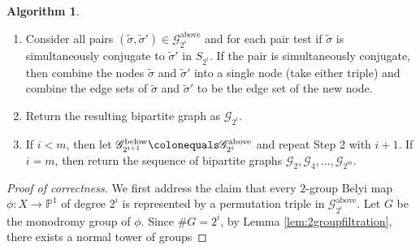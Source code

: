 \documentclass{dcthesis}
\newcommand{\PP}{\mathbb P}
\newcommand{\wt}[1]{\widetilde{#1}}
\DeclareMathOperator{\Lifts}{Lifts}
\theoremstyle{definition}
\newtheorem{alg}[prop]{Algorithm}
\theoremstyle{remark}
\numberwithin{equation}{section}
\numberwithin{figure}{section}
\begin{document}
{{\begin{alg}
\begin{enumerate}
\begin{enumerate}
              As a word of caution,
              the notation $\Lifts(\sigma)$ has
              a different meaning here than in
              Algorithm \ref{alg:triples}.
              Here $\Lifts(\sigma)$ is the set of
              lifts of $\sigma$ up to simultaneous
              conjugation.
              Let
              \[
                \mathscr{G}_{2^i}^\text{above}
                \colonequals
                \bigcup_{\sigma\in\mathscr{G}_{2^i}^\text{below}}
                \Lifts(\sigma)
              \]
              and place an edge 
              of $\mathscr{G}_{2^i}$
              between
              $\wt{\sigma}\in\mathscr{G}_{2^i}^\text{above}$
              and
              $\sigma\in\mathscr{G}_{2^i}^\text{below}$
              if and only if $\wt{\sigma}\in\Lifts(\sigma)$.
            \item
              Consider all pairs $(\wt{\sigma},\wt{\sigma}')\in\mathscr{G}_{2^i}^\text{above}$
              and for each pair
              test if $\wt{\sigma}$ is simultaneously conjugate to
              $\wt{\sigma}'$ in $S_{2^i}$.
              If the pair is simultaneously conjugate,
              then combine the nodes $\wt{\sigma}$ and $\wt{\sigma}'$
              into a single node (take either triple)
              and combine the edge sets of $\wt{\sigma}$
              and $\wt{\sigma}'$ to be the edge set of the new node.
            \item
              Return the resulting bipartite graph as
              $\mathscr{G}_{2^i}$.
            \item
              If $i<m$, then let
              $\mathscr{G}_{2^{i+1}}^\text{below}\colonequals\mathscr{G}_{2^i}^\text{above}$
              and repeat Step 2 with $i+1$.
              If $i=m$,
              then return the sequence of bipartite graphs
              $\mathscr{G}_2,\mathscr{G}_4,\dots,\mathscr{G}_{2^m}$.
          \end{enumerate}
      \end{enumerate}
    \end{alg}
    \begin{proof}[Proof of correctness]
      We first address the claim that
      every $2$-group Belyi map $\phi:X\to\PP^1$ of degree $2^i$
      is represented by a permutation triple in
      $\mathcal{G}_{2^i}^\text{above}$.
      Let $G$ be the monodromy group of $\phi$.
      Since $\#G=2^i$,
      by Lemma \ref{lem:2groupfiltration},
      there exists a normal tower of groups

\end{proof}}}
\end{document}
